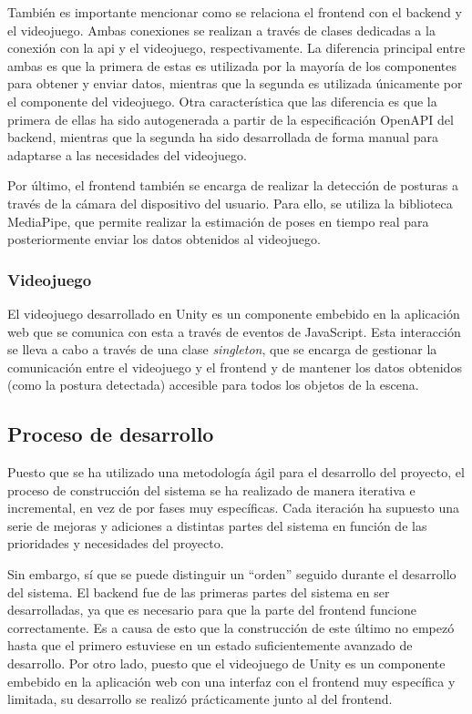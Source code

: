 También es importante mencionar como se relaciona el \gls{frontend} con el \gls{backend} y el
videojuego. Ambas conexiones se realizan a través de clases dedicadas a la conexión con la
\gls{api} y el videojuego, respectivamente. La diferencia principal entre ambas es que la primera
de estas es utilizada por la mayoría de los componentes para obtener y enviar datos, mientras
que la segunda es utilizada únicamente por el componente del videojuego. Otra característica que
las diferencia es que la primera de ellas ha sido autogenerada a partir de la especificación OpenAPI
del \gls{backend}, mientras que la segunda ha sido desarrollada de forma manual para adaptarse a las
necesidades del videojuego.

Por último, el \gls{frontend} también se encarga de realizar la detección de posturas a través de
la cámara del dispositivo del usuario. Para ello, se utiliza la biblioteca MediaPipe, que
permite realizar la estimación de poses en tiempo real para posteriormente enviar los datos
obtenidos al videojuego.

\subsubsection{Videojuego}
El videojuego desarrollado en Unity es un componente embebido en la aplicación
web que se comunica con esta a través de eventos de JavaScript. Esta interacción
se lleva a cabo a través de una clase \textit{singleton}, que se encarga de
gestionar la comunicación entre el videojuego y el \gls{frontend} y de mantener
los datos obtenidos (como la postura detectada) accesible para todos los objetos
de la escena.

\subsection{Proceso de desarrollo}
Puesto que se ha utilizado una metodología ágil para el desarrollo del proyecto, el proceso de
construcción del sistema se ha realizado de manera iterativa e incremental, en vez de por fases muy
específicas. Cada iteración ha supuesto una serie de mejoras y adiciones a distintas partes del
sistema en función de las prioridades y necesidades del proyecto.

Sin embargo, sí que se puede distinguir un \enquote{orden} seguido durante el
desarrollo del sistema. El \gls{backend} fue de las primeras partes del sistema
en ser desarrolladas, ya que es necesario para que la parte del \gls{frontend}
funcione correctamente. Es a causa de esto que la construcción de este último no
empezó hasta que el primero estuviese en un estado suficientemente avanzado de
desarrollo. Por otro lado, puesto que el videojuego de Unity es un
componente embebido en la aplicación web con una interfaz con el \gls{frontend}
muy específica y limitada, su desarrollo se realizó prácticamente junto al del
\gls{frontend}.


